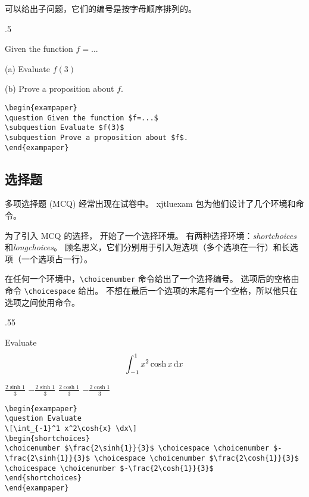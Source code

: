 可以给出子问题，它们的编号是按字母顺序排列的。
\begin{miniexammar}{.5\textandmarginlen}{
\begin{exampaper}
\question Given the function $f=...$

\hspace{1.5em}(a) Evaluate $f(3)$

\hspace{1.5em}(b) Prove a proposition about $f$.
\end{exampaper}
}
\begin{lstlisting}
\begin{exampaper}
\question Given the function $f=...$
\subquestion Evaluate $f(3)$
\subquestion Prove a proposition about $f$.
\end{exampaper}
\end{lstlisting}
\end{miniexammar}

\subsection{选择题}
多项选择题 (MCQ) 经常出现在试卷中。 xjtluexam 包为他们设计了几个环境和命令。

为了引入 MCQ 的选择，\raul{} 开始了一个选择环境。 有两种选择环境：\emph{shortchoices} 和\emph{longchoices}。 顾名思义，它们分别用于引入短选项（多个选项在一行）和长选项（一个选项占一行）。

在任何一个环境中，\verb=\choicenumber= 命令给出了一个选择编号。 选项后的空格由命令 \verb=\choicespace= 给出。 \raul{} 不想在最后一个选项的末尾有一个空格，所以他只在选项之间使用命令。
\begin{miniexammar}{.55\textandmarginlen}{
\begin{exampaper}
\question Evaluate
\[
\int_{-1}^1 x^2\cosh{x} \,\mathrm{d} x
\]
\begin{shortchoices}
\choicenumber $\frac{2\sinh{1}}{3}$ \choicespace
\choicenumber $-\frac{2\sinh{1}}{3}$ \choicespace
\choicenumber $\frac{2\cosh{1}}{3}$ \choicespace
\choicenumber $-\frac{2\cosh{1}}{3}$ 
\end{shortchoices}
\end{exampaper}
}
\begin{lstlisting}
\begin{exampaper}
\question Evaluate
\[\int_{-1}^1 x^2\cosh{x} \dx\]
\begin{shortchoices}
\choicenumber $\frac{2\sinh{1}}{3}$ \choicespace \choicenumber $-\frac{2\sinh{1}}{3}$ \choicespace \choicenumber $\frac{2\cosh{1}}{3}$ \choicespace \choicenumber $-\frac{2\cosh{1}}{3}$ 
\end{shortchoices}
\end{exampaper}
\end{lstlisting}
\end{miniexammar}

